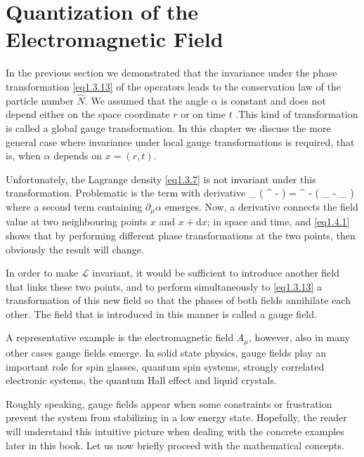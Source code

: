 
\section{Quantization of the Electromagnetic Field}
In the previous section we demonstrated that the invariance under the phase transformation \eqref{eq1.3.13} of the operators leads to the conservation law of the particle number $\hat { N }$. We assumed that the angle $\alpha$ is constant and does not depend either on the space coordinate $r$ or on time $t$ .This kind of transformation is called a global gauge transformation. In this chapter we discuss the more general case where invariance under local gauge transformations is required, that is, when $\alpha$ depends on $x = ( r , t )$. 

Unfortunately, the Lagrange density \eqref{eq1.3.7} is not invariant under this transformation. Problematic is the term with derivative
\be\label{eq1.4.1}
\partial _ { \mu } \left( \psi {} ^ { -  \alpha } \right) =  ^ { -  \alpha } \left( \partial _ { \mu } \psi -  \partial _ { \mu } \alpha \cdot \psi \right)
\ee
where a second term containing $\partial _ { \mu } \alpha$ emerges. Now, a derivative connects the field value at two neighbouring points $x$ and $x + \mathrm{d}x$; in space and time, and \eqref{eq1.4.1} shows that by performing different phase transformations at the two points, then obviously the result will change. 

In order to make $\mathcal { L }$ invariant, it would be sufficient to introduce another field that links these two points, and to perform simultaneously to \eqref{eq1.3.13} a transformation of this new field so that the phases of both fields annihilate each other. The field that is introduced in this manner is called a gauge field. 

A representative example is the electromagnetic field $A_\mu$, however, also in many other cases gauge fields emerge. In solid state physics, gauge fields play an important role for spin glasses, quantum spin systems, strongly correlated electronic systems, the quantum Hall effect and liquid crystals. 

Roughly speaking, gauge fields appear when some constraints or frustration prevent the system from stabilizing in a low energy state. Hopefully, the reader will understand this intuitive picture when dealing with the concrete examples later in this book. Let us now briefly proceed with the mathematical concepts.

